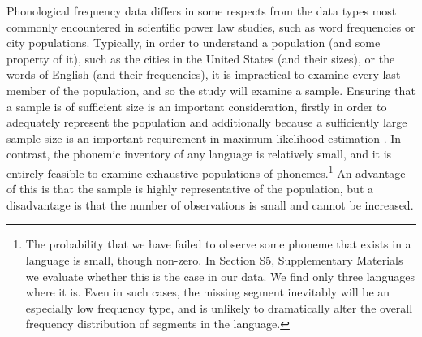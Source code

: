 Phonological frequency data differs in some respects from the data types most commonly encountered in scientific power law studies, such as word frequencies or city populations. Typically, in order to understand a population (and some property of it), such as the cities in the United States (and their sizes), or the words of English (and their frequencies), it is impractical to examine every last member of the population, and so the study will examine a sample. Ensuring that a sample is of sufficient size is an important consideration, firstly in order to adequately represent the population and additionally because a sufficiently large sample size is an important requirement in maximum likelihood estimation \autocites{barndorff-nielsen_inference_1994}{newman_power_2005}. In contrast, the phonemic inventory of any language is relatively small, and it is entirely feasible to examine exhaustive populations of phonemes.\footnote{The probability that we have failed to observe some phoneme that exists in a language is small, though non-zero. In Section S5, Supplementary Materials we evaluate whether this is the case in our data. We find only three languages where it is. Even in such cases, the missing segment inevitably will be an especially low frequency type, and is unlikely to dramatically alter the overall frequency distribution of segments in the language.} An advantage of this is that the sample is highly representative of the population, but a disadvantage is that the number of observations is small and cannot be increased.

